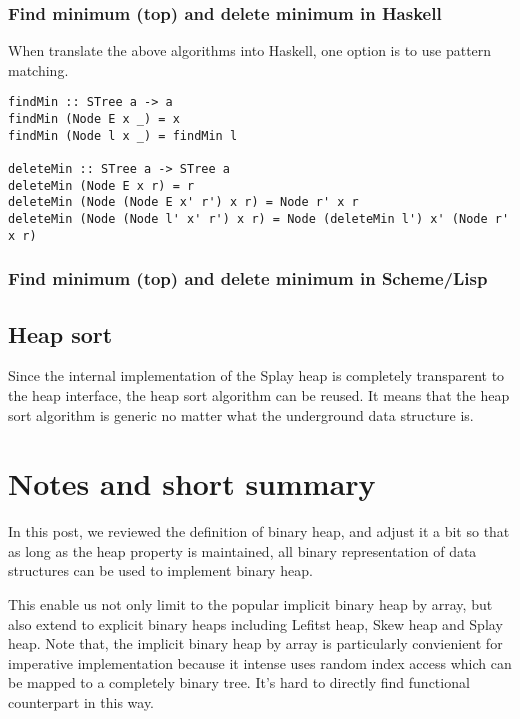 \documentclass{article}
\begin{document}
\subsubsection*{Find minimum (top) and delete minimum in Haskell}

When translate the above algorithms into Haskell, one option is to
use pattern matching.

\lstset{language=Haskell}
\begin{lstlisting}
findMin :: STree a -> a
findMin (Node E x _) = x
findMin (Node l x _) = findMin l

deleteMin :: STree a -> STree a
deleteMin (Node E x r) = r
deleteMin (Node (Node E x' r') x r) = Node r' x r
deleteMin (Node (Node l' x' r') x r) = Node (deleteMin l') x' (Node r' x r)
\end{lstlisting}

\subsubsection*{Find minimum (top) and delete minimum in Scheme/Lisp}

\subsection{Heap sort}

Since the internal implementation of the Splay heap is completely
transparent to the heap interface, the heap sort algorithm can
be reused. It means that the heap sort algorithm is generic no
matter what the underground data structure is.

\section{Notes and short summary}

In this post, we reviewed the definition of binary heap, and adjust it
a bit so that as long as the heap property is maintained, all binary
representation of data structures can be used to implement binary heap.

This enable us not only limit to the popular implicit binary heap
by array, but also extend to explicit binary heaps including Lefitst
heap, Skew heap and Splay heap. Note that, the implicit binary heap
by array is particularly convienient for imperative implementation
because it intense uses random index access which can be mapped to
a completely binary tree. It's hard to directly find functional
counterpart in this way. 
\end{document}

